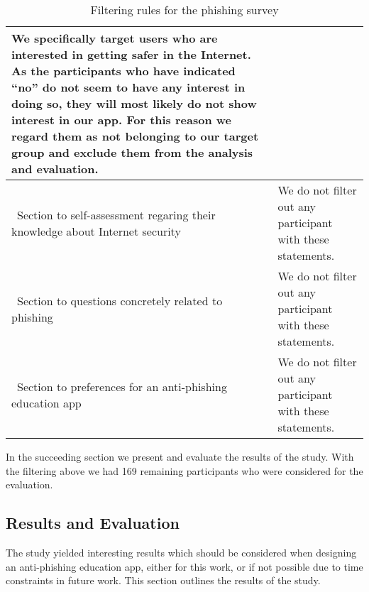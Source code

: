 \begin{table}[hHtbp]
\begin{tabular}{ | p{5cm} | p{10cm} |}
 We specifically target users who are interested in getting safer in the Internet.
 As the participants who have indicated ``no'' do not seem to have any interest in doing so, they will most likely do not show interest in our app.
 For this reason we regard them as not belonging to our target group and exclude them from the analysis and evaluation.
\\
    \hline\  Section to self-assessment regaring their knowledge about Internet security &  We do not filter out any participant with these statements.
\\
		\hline\  Section to questions concretely related to phishing & We do not filter out any participant with these statements.
 \\
    \hline\  Section to preferences for an anti-phishing education app & We do not filter out any participant with these statements.
\\
    \hline
    \end{tabular}
    \caption{Filtering rules for the phishing survey}
    \label{table:prestudy_filter}
    
\end{table}

In the succeeding section we present and evaluate the results of the study.
 With the filtering above we had 169 remaining participants who were considered for the evaluation.

\subsection{Results and Evaluation}
The study yielded interesting results which should be considered when designing an anti-phishing education app, either for this work, or if not possible due to time constraints in future work.
 This section outlines the results of the study.


